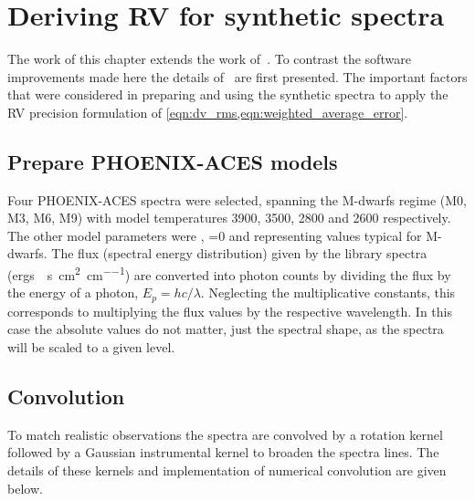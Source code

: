 
\section{Deriving RV for synthetic spectra}
The work of this chapter extends the work of~\citep{figueira_radial_2016}.
To contrast the software improvements made here the details of~\citep{figueira_radial_2016} are first presented.
The important factors that were considered in preparing and using the synthetic spectra to apply the RV precision formulation of \cref{eqn:dv_rms,eqn:weighted_average_error}.

\subsection{Prepare {PHOENIX-ACES} models}
Four {PHOENIX-ACES} spectra were selected, spanning the M-dwarfs regime (M0, {M3}, {M6}, {M9}) with model temperatures 3900, 3500, 2800 and 2600\K{} respectively.
The other model parameters were , \feh{}=0 and  representing values typical for M-dwarfs.
The flux (spectral energy distribution) given by the library spectra (\si{{ergs} \per\second\per\centi\meter\squared\per\centi\metre}) are converted into photon counts by dividing the flux by the energy of a photon, \({E}_{p}=hc/\lambda\).
Neglecting the multiplicative constants, this corresponds to multiplying the flux values by the respective wavelength.
In this case the absolute values do not matter, just the spectral shape, as the spectra will be scaled to a given \snr{} level.

\subsection{Convolution}
\label{subsec:convolutions}
To match realistic observations the spectra are convolved by a rotation kernel followed by a Gaussian instrumental kernel to broaden the spectra lines.
The details of these kernels and implementation of numerical convolution are given below.

